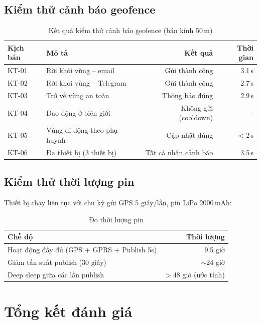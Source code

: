 \subsection{Kiểm thử cảnh báo geofence}

\begin{table}[H]
\centering
\caption{Kết quả kiểm thử cảnh báo geofence (bán kính 50\,m)}
\label{tab:geofence_test}
\begin{tabularx}{\textwidth}{l X r r}
\toprule
\textbf{Kịch bản} & \textbf{Mô tả} & \textbf{Kết quả} & \textbf{Thời gian} \\
\midrule
KT-01 & Rời khỏi vùng -- email & Gửi thành công & 3.1\,s \\
KT-02 & Rời khỏi vùng -- Telegram & Gửi thành công & 2.7\,s \\
KT-03 & Trở về vùng an toàn & Thông báo đúng & 2.9\,s \\
KT-04 & Dao động ở biên giới & Không gửi (cooldown) & -- \\
KT-05 & Vùng di động theo phụ huynh & Cập nhật đúng & $<$2\,s \\
KT-06 & Đa thiết bị (3 thiết bị) & Tất cả nhận cảnh báo & 3.5\,s \\
\bottomrule
\end{tabularx}
\end{table}

\subsection{Kiểm thử thời lượng pin}

Thiết bị chạy liên tục với chu kỳ gửi GPS 5 giây/lần, pin LiPo 2000\,mAh:

\begin{table}[H]
\centering
\caption{Đo thời lượng pin}
\label{tab:battery}
\begin{tabular}{l r}
\toprule
\textbf{Chế độ} & \textbf{Thời lượng} \\
\midrule
Hoạt động đầy đủ (GPS + GPRS + Publish 5s) & 9.5 giờ \\
Giảm tần suất publish (30 giây) & $\sim$24 giờ \\
Deep sleep giữa các lần publish & $>$48 giờ (ước tính) \\
\bottomrule
\end{tabular}
\end{table}

\section{Tổng kết đánh giá}

